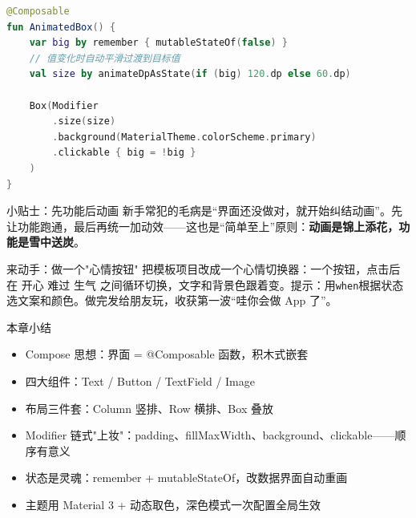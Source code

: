 \begin{lstlisting}[language=Kotlin]
@Composable
fun AnimatedBox() {
    var big by remember { mutableStateOf(false) }
    // 值变化时自动平滑过渡到目标值
    val size by animateDpAsState(if (big) 120.dp else 60.dp)

    Box(Modifier
        .size(size)
        .background(MaterialTheme.colorScheme.primary)
        .clickable { big = !big }
    )
}
\end{lstlisting}

\begin{tcbinfo}{小贴士：先功能后动画}
新手常犯的毛病是“界面还没做对，就开始纠结动画”。先让功能跑通，最后再统一加动效——这也是“简单至上”原则：\textbf{动画是锦上添花，功能是雪中送炭}。

\end{tcbinfo}

\begin{tcbpractice}{来动手：做一个"心情按钮"}
把模板项目改成一个心情切换器：一个按钮，点击后在 开心 难过 生气 之间循环切换，文字和背景色跟着变。提示：用\texttt{when}根据状态选文案和颜色。做完发给朋友玩，收获第一波“哇你会做 App 了”。

\end{tcbpractice}

\begin{tcbsummary}{本章小结}
\begin{itemize}
  \item Compose 思想：界面 = @Composable 函数，积木式嵌套
  \item 四大组件：Text / Button / TextField / Image
  \item 布局三件套：Column 竖排、Row 横排、Box 叠放
  \item Modifier 链式"上妆"：padding、fillMaxWidth、background、clickable——顺序有意义
  \item 状态是灵魂：remember + mutableStateOf，改数据界面自动重画
  \item 主题用 Material 3 + 动态取色，深色模式一次配置全局生效
\end{itemize}

\end{tcbsummary}
